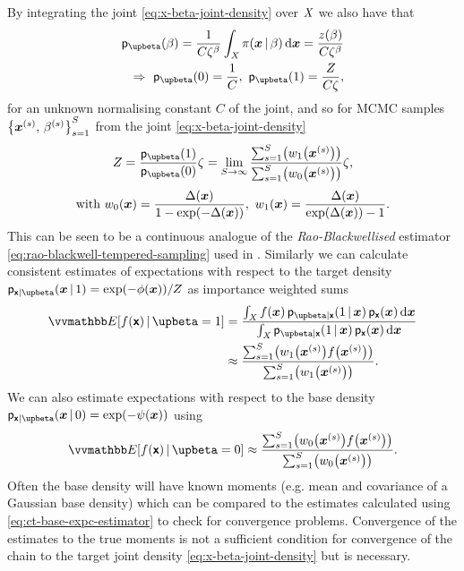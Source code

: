 By integrating the joint \eqref{eq:x-beta-joint-density} over $\mathit{X}$ we also have that
\begin{equation}\label{eq:beta-marginal-0-1}
\begin{split}
\pden{\upbeta}(\beta) = \frac{1}{C\zeta^\beta} \int_{\set{X}} 
  \pi(\vct{x}\gvn\beta)
\,\dr\vct{x} =
\frac{\partfunc(\beta)}{C\zeta^\beta}\\
\Rightarrow ~
\pden{\upbeta}(0) = \frac{1}{C}
,~
\pden{\upbeta}(1) = \frac{\normconst}{C \zeta},
\end{split}
\end{equation}
for an unknown normalising constant $C$ of the joint, and so for \ac{MCMC} samples $\lbr \vct{x}^{(s)},\,\beta^{(s)}\rbr_{s=1}^S$ from the joint \eqref{eq:x-beta-joint-density}
\begin{equation}\label{eq:ct-norm-const-estimator}
\normconst = \frac{\pden{\upbeta}(1)}{\pden{\upbeta}(0)} \zeta = 
\lim_{S\to\infty} \frac
{\sum_{s=1}^S\lpa w_1\lpa \vct{x}^{(s)}\rpa\rpa}
{\sum_{s=1}^S\lpa w_0\lpa \vct{x}^{(s)}\rpa\rpa}
\zeta,
\end{equation}
\begin{equation*}
\textrm{with }
w_0(\vct{x}) = \frac{\Delta(\vct{x})}{1 - \exp\lpa-\Delta(\vct{x})\rpa},~
w_1(\vct{x}) = \frac{\Delta(\vct{x})}{\exp\lpa\Delta(\vct{x})\rpa - 1}.
\end{equation*}
This can be seen to be a continuous analogue of the \emph{Rao-Blackwellised} estimator \eqref{eq:rao-blackwell-tempered-sampling} used in \cite{carlson2016partition}. Similarly we can calculate consistent estimates of expectations with respect to the target density $\pden{\rvct{x}|\upbeta}(\vct{x}\gvn 1) = \exp\lpa-\phi(\vct{x})\rpa / Z$ as importance weighted sums
\begin{align}\label{eq:ct-target-expc-estimator}
\expc{f(\rvct{x})\gvn\upbeta=1} &=
\frac{
  \int_{\set{X}} 
    f(\vct{x})\, \pden{\upbeta|\rvct{x}}(1 \gvn \vct{x}) \, \pden{\rvct{x}}(\vct{x})
  \,\dr\vct{x}
}{
  \int_{\set{X}} 
    \pden{\upbeta|\rvct{x}}(1 \gvn \vct{x}) \, \pden{\rvct{x}}(\vct{x})
  \,\dr\vct{x}
} 
\nonumber\\
&\approx
\frac
{\sum_{s=1}^S \lpa w_1\lpa \vct{x}^{(s)}\rpa f\lpa\vct{x}^{(s)}\rpa\rpa}
{\sum_{s=1}^S\lpa w_1\lpa \vct{x}^{(s)}\rpa \rpa}.
\end{align}
We can also estimate expectations with respect to the base density $\pden{\rvct{x}|\upbeta}(\vct{x}\gvn 0) = \exp\lpa-\psi(\vct{x})\rpa$ using
\begin{equation}\label{eq:ct-base-expc-estimator}
\expc{f(\rvct{x})\gvn\upbeta=0}
\approx
\frac
{\sum_{s=1}^S \lpa w_0\lpa \vct{x}^{(s)}\rpa f\lpa\vct{x}^{(s)}\rpa\rpa}
{\sum_{s=1}^S\lpa w_0\lpa \vct{x}^{(s)}\rpa \rpa}.
\end{equation}
Often the base density will have known moments (e.g. mean and covariance of a Gaussian base density) which can be compared to the estimates calculated using \eqref{eq:ct-base-expc-estimator} to check for convergence problems. Convergence of the estimates to the true moments is not a sufficient condition for convergence of the chain to the target joint density \eqref{eq:x-beta-joint-density} but is necessary.

